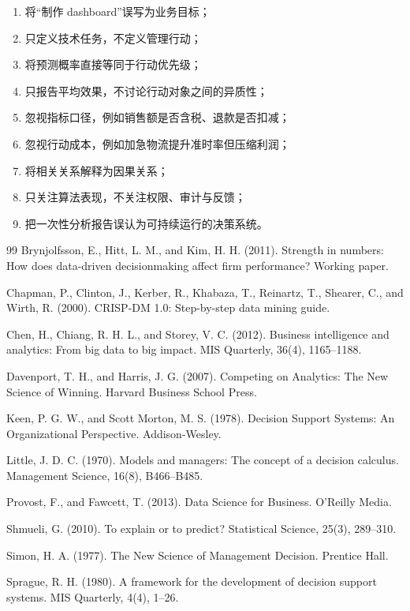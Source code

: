 \documentclass[UTF8,fontset=fandol,openany,zihao=-4]{ctexbook}
\begin{document}
\begin{enumerate}
  \item 将“制作 dashboard”误写为业务目标；
  \item 只定义技术任务，不定义管理行动；
  \item 将预测概率直接等同于行动优先级；
  \item 只报告平均效果，不讨论行动对象之间的异质性；
  \item 忽视指标口径，例如销售额是否含税、退款是否扣减；
  \item 忽视行动成本，例如加急物流提升准时率但压缩利润；
  \item 将相关关系解释为因果关系；
  \item 只关注算法表现，不关注权限、审计与反馈；
  \item 把一次性分析报告误认为可持续运行的决策系统。
\end{enumerate}

\begin{thebibliography}{99}
Brynjolfsson, E., Hitt, L. M., and Kim, H. H. (2011).
\newblock Strength in numbers: How does data-driven decisionmaking affect firm performance?
\newblock Working paper.

Chapman, P., Clinton, J., Kerber, R., Khabaza, T., Reinartz, T., Shearer, C., and Wirth, R. (2000).
\newblock CRISP-DM 1.0: Step-by-step data mining guide.

Chen, H., Chiang, R. H. L., and Storey, V. C. (2012).
\newblock Business intelligence and analytics: From big data to big impact.
\newblock MIS Quarterly, 36(4), 1165--1188.

Davenport, T. H., and Harris, J. G. (2007).
\newblock Competing on Analytics: The New Science of Winning.
\newblock Harvard Business School Press.

Keen, P. G. W., and Scott Morton, M. S. (1978).
\newblock Decision Support Systems: An Organizational Perspective.
\newblock Addison-Wesley.

Little, J. D. C. (1970).
\newblock Models and managers: The concept of a decision calculus.
\newblock Management Science, 16(8), B466--B485.

Provost, F., and Fawcett, T. (2013).
\newblock Data Science for Business.
\newblock O'Reilly Media.

Shmueli, G. (2010).
\newblock To explain or to predict?
\newblock Statistical Science, 25(3), 289--310.

Simon, H. A. (1977).
\newblock The New Science of Management Decision.
\newblock Prentice Hall.

Sprague, R. H. (1980).
\newblock A framework for the development of decision support systems.
\newblock MIS Quarterly, 4(4), 1--26.
\end{thebibliography}
\end{document}

